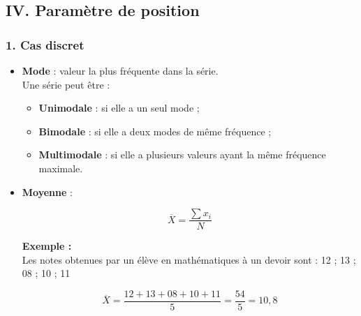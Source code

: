 \documentclass[a4paper,12pt]{article}
\begin{document}
\subsection*{IV. Paramètre de position}

\subsubsection*{1. Cas discret}

\begin{itemize}
    \item \textbf{Mode} : valeur la plus fréquente dans la série.\\
    Une série peut être :
    \begin{itemize}
        \item \textbf{Unimodale} : si elle a un seul mode ;
        \item \textbf{Bimodale} : si elle a deux modes de même fréquence ;
        \item \textbf{Multimodale} : si elle a plusieurs valeurs ayant la même fréquence maximale.
    \end{itemize}

    \item \textbf{Moyenne} :
    
    \begin{tcolorbox}[colback=white, colframe=black, title=Moyenne d’une série discrète]
    \[
    \overline{X} = \frac{\sum x_i}{N}
    \]
    \end{tcolorbox}
    
    \textbf{Exemple :}\\
    Les notes obtenues par un élève en mathématiques à un devoir sont : 12 ; 13 ; 08 ; 10 ; 11

    \[
    \overline{X} = \frac{12 + 13 + 08 + 10 + 11}{5} = \frac{54}{5} = 10{,}8
    \]
\end{itemize}
\end{document}
